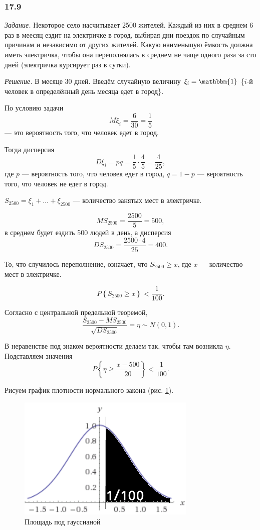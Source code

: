\subsubsection{17.9}

\textit{Задание.} Некоторое село насчитывает 2500 жителей.
Каждый из них в среднем 6 раз в меесяц ездит на электричке в город,
выбирая дни поездок по случайным причинам и независимо от других жителей.
Какую наименьшую ёмкость должна иметь электричка,
чтобы она переполнялась в среднем не чаще одного раза за сто дней
(электричка курсирует раз в сутки).

\textit{Решение.} В месяце 30 дней.
Введём случайную величину $ \xi_i = \mathbbm{1}$ \{$i$-й человек в определённый день месяца едет в город\}.

По условию задачи
$$M \xi_i =
  \frac{6}{30} =
  \frac{1}{5}$$
--- это вероятность того, что человек едет в город.

Тогда дисперсия
$$D \xi_i =
  pq =
  \frac{1}{5} \cdot \frac{4}{5} =
  \frac{4}{25},$$
где $p$ --- вероятность того, что человек едет в город, $q = 1 - p$ --- вероятность того,
что человек не едет в город.

$S_{2500} = \xi_1 + \dotsc + \xi_{2500}$ --- количество занятых мест в электричке.

$$MS_{2500} =
  \frac{2500}{5} =
  500,$$
в среднем будет ездить 500 людей в день, а дисперсия
$$DS_{2500} =
  \frac{2500 \cdot 4}{25} =
  400.$$

То, что случилось переполнение, означает, что $S_{2500} \geq x$, где $x$ ---
количество мест в электричке.

$$P \left\{ S_{2500} \geq x \right\} <
  \frac{1}{100}.$$

Согласно с центральной предельной теоремой,
$$ \frac{S_{2500} - MS_{2500}}{ \sqrt{DS_{2500}}} =
  \eta \sim
  N \left( 0, 1 \right).$$

В неравенстве под знаком вероятности делаем так, чтобы там возникла $ \eta $.
Подставляем значения
$$P \left\{ \eta \geq \frac{x - 500}{20} \right\} <
  \frac{1}{100}.$$

Рисуем график плотности нормального закона (рис. \ref{fig:179}).

\begin{figure}[h!]
  \centering
  \includegraphics[width=.4\textwidth]{./pictures/17_9.png}
  \caption{Площадь под гауссианой}
  \label{fig:179}
\end{figure}

